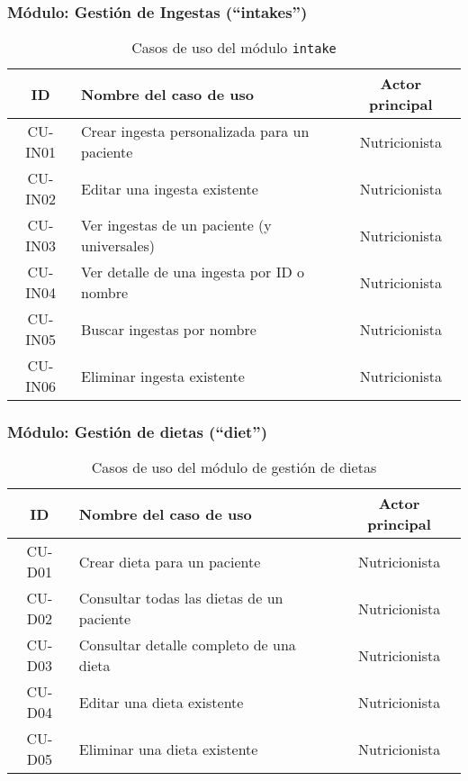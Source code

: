 \subsubsection*{Módulo: Gestión de Ingestas (``intakes'')}

\begin{table}[H]
\centering
\begin{tabular}{|c|p{7.5cm}|c|}
\hline
\textbf{ID} & \textbf{Nombre del caso de uso} & \textbf{Actor principal} \\
\hline
CU-IN01 & Crear ingesta personalizada para un paciente & Nutricionista \\
\hline
CU-IN02 & Editar una ingesta existente & Nutricionista \\
\hline
CU-IN03 & Ver ingestas de un paciente (y universales) & Nutricionista \\
\hline
CU-IN04 & Ver detalle de una ingesta por ID o nombre & Nutricionista \\
\hline
CU-IN05 & Buscar ingestas por nombre & Nutricionista \\
\hline
CU-IN06 & Eliminar ingesta existente & Nutricionista \\
\hline
\end{tabular}
\caption{Casos de uso del módulo \texttt{intake}}
\end{table}

\subsubsection*{Módulo: Gestión de dietas (``diet'')}

\begin{table}[H]
\centering
\begin{tabular}{|c|p{7.5cm}|c|}
\hline
\textbf{ID} & \textbf{Nombre del caso de uso} & \textbf{Actor principal} \\
\hline
CU-D01 & Crear dieta para un paciente & Nutricionista \\
\hline
CU-D02 & Consultar todas las dietas de un paciente & Nutricionista \\
\hline
CU-D03 & Consultar detalle completo de una dieta & Nutricionista \\
\hline
CU-D04 & Editar una dieta existente & Nutricionista \\
\hline
CU-D05 & Eliminar una dieta existente & Nutricionista \\
\hline
\end{tabular}
\caption{Casos de uso del módulo de gestión de dietas}
\end{table}

